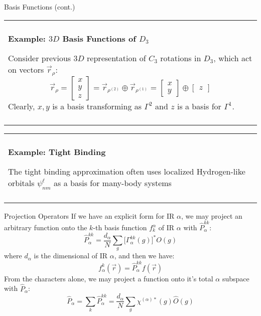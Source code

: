 \documentclass[11pt]{beamer}
\newenvironment{boxed2}
    {\begin{center}
    \begin{tabular}{|p{0.95\textwidth}|}
    \hline\\
    }
    { 
    \\\\\hline
    \end{tabular} 
    \end{center}
    }
\begin{document}
\begin{frame}{Basis Functions (cont.)}
		\small

	\begin{boxed2}
		
		\vspace{-.5cm}
		
		\textbf{Example: $3D$ Basis Functions of $D_3$}
		
		Consider previous $3D$ representation of $C_3$ rotations in $D_3$, which act on vectors $\vec{r}_{\rho}$:
		$$
		\vec{r}_{\rho}=\begin{bmatrix}
			x\\y\\z
		\end{bmatrix} = \vec{r}_{\rho^{(2)}}\oplus\vec{r}_{\rho^{(1)}} =\begin{bmatrix}
		x\\y
		\end{bmatrix}\oplus\begin{bmatrix}
		z
		\end{bmatrix}
		$$
		Clearly, $x,y$ is a basis transforming as $\Gamma^{2}$ and $z$ is a basis for $\Gamma^1$.

	\end{boxed2}
	
		\begin{boxed2}
		
		\vspace{-.41cm}
		
		\textbf{Example: Tight Binding} 
		
		The tight binding approximation often uses localized Hydrogen-like orbitals $\psi_{nm}^{\ell}$ as a basis for many-body systems
		
		\vspace{-.3cm}
		
	\end{boxed2}
	
\end{frame}

\begin{frame}{Projection Operators}
	If we have an explicit form for IR $\alpha$, we may project an arbitrary function onto the $k$-th basis function $f^{\alpha}_k$ of IR $\alpha$ with $\hat{P}_{\alpha}^{kk}$:
	$$
	\hat{P}_{\alpha}^{kk} = \frac{d_{\alpha}}{N}\sum_g \big[\Gamma^{kk}_{\alpha}(g) \big]^* O(g)
	$$
	where $d_{\alpha}$ is the dimensional of IR $\alpha$, and then we have:
	$$
	f_{\alpha}^k(\vec{r}) = \hat{P}_{\alpha}^{kk}f(\vec{r})
	$$
	From the characters alone, we may project a function onto it's total $\alpha$ subspace with $\hat{P}_{\alpha}$:
	$$
	\hat{P}_{\alpha} = \sum_k\hat{P}^{kk}_{\alpha} = \frac{d_{\alpha}}{N}\sum_{g}\chi^{(\alpha)*}(g)\hat{O}(g)
	$$


\end{frame}
\end{document}
